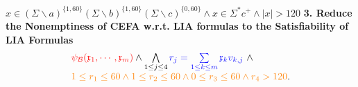 \documentclass[landscape]{beamer}
\newcommand{\aut}{\mathcal{A}}
\newcommand{\myvec}[1]{\overrightarrow{#1}}
\newcommand{\cB}{\mathcal{B}}
\newcommand{\anivar}{\mathfrak{x}}
\begin{document}
\begin{frame}{$ x\in (\Sigma \backslash a)^{\{1,60\}}(\Sigma \backslash b)^{\{1,60\}}(\Sigma \backslash c)^{\{0,60\}} \wedge x\in \Sigma^*c^+ \wedge |x| > 120$}
  \textbf{3. Reduce the Nonemptiness of CEFA w.r.t. LIA formulas to the Satisfiability of LIA Formulas}
  \begin{equation*}\label{eqn-LIA}
    \begin{array}{l}
      \textcolor{red!90}{\psi_\cB(\anivar_1, \cdots, \anivar_m)} \wedge \bigwedge \limits_{1 \le j \le 4} \textcolor{blue!90}{ r_j = \sum \limits_{1\le k \le m}  \anivar_k v_{k, j}}\ \wedge \\
      \textcolor{orange!90}{1 \le r_1 \le 60 \wedge 1 \le r_2 \le 60 \wedge 0 \le r_3 \le 60 \wedge r_4 > 120}.
    \end{array}
  \end{equation*}
\end{frame}


\end{document}
